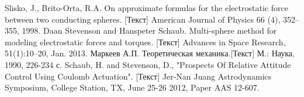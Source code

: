 \begin{thebibliography}{99}
 Slisko, J., Brito-Orta, R.A. On approximate formulas for the electrostatic force between two conducting spheres. [Текст] American Journal of Physics 66 (4), 352–355, 1998.
 Daan Stevenson and Hanspeter Schaub. Multi-sphere method for modeling electrostatic forces and torques. [Текст] Advances in Space Research, 51(1):10–20, Jan. 2013.
 Маркеев А.П. Теоретическая механика.[Текст] М.: Наука, 1990, 226-234 с.
 Schaub, H. and Stevenson, D., "Prospects Of Relative Attitude Control Using Coulomb Actuation". [Текст] Jer-Nan Juang Astrodynamics Symposium, College Station, TX, June 25-26 2012, Paper AAS 12-607.
\end{thebibliography}